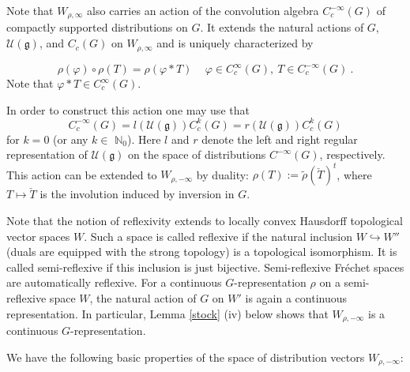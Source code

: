 \documentclass[10]{amsart}
\theoremstyle{remark}
\theoremstyle{definition}
\numberwithin{equation}{section}
\newcommand{\fg}{{\mathfrak g}}
\newcommand{\vp}{\varphi}
\newcommand{\Cal}{\mathcal}
\newcommand{\be}{\begin{equation}}
\begin{document}
{Note that  $W_{\rho,\infty}$ also carries an action of the convolution algebra $C_c^{-\infty}(G)$ of compactly supported distributions on $G$. It extends the natural actions of
$G$, $ {\Cal U}(\fg)$, and $C_c(G)$ on $W_{\rho,\infty}$ and is uniquely characterized by

$$ \rho(\vp)\circ\rho(T)=\rho(\vp*T)\,\quad \vp\in C_c^{\infty}(G),\ T\in    C_c^{-\infty}(G)\ .$$
Note that $\vp*T \in C_c^{\infty}(G)$.

In order to construct this action one may use that
\be
 C_c^{-\infty}(G) =l({\Cal U}(\fg)) C_c^{k}(G)=r({\Cal U}(\fg))  C_c^{k}(G) \label{hut}
\end{equation}
for $k=0$ (or any $k\in$ $\mathbb N_0$). Here $l$ and $r$ denote the left and right regular representation of  ${\Cal U}(\fg)$ on  the space of distributions $C^{-\infty}(G)$, respectively. This action can be extended to $ W_{\rho,-\infty}$ by duality: $\rho(T):=\tilde\rho(\check{T})^t$, where $T\mapsto\check T$ is the involution induced by inversion
in $G$.

Note that the notion of reflexivity extends to locally convex Hausdorff topological vector spaces $W$. Such a space is called reflexive if the natural inclusion $W\hookrightarrow W''$
(duals are equipped with the strong topology) is a topological isomorphism. It is called semi-reflexive if this inclusion is just bijective. Semi-reflexive Fr\'echet spaces are automatically
reflexive. For a continuous $G$-representation $\rho$ on a semi-reflexive space $W$, the natural action of $G$ on $W'$ is again a continuous representation.
In particular, Lemma \ref{stock} (iv) below shows that $W_{\rho,-\infty}$ is a continuous $G$-representation.

We have the following basic properties of the space of distribution vectors $W_{\rho,-\infty}$:

}
\end{document}

